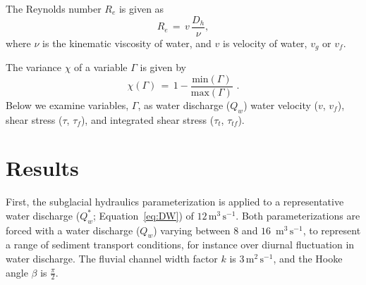 \documentclass[11pt]{article}
\newcommand{\unit}[1]{$\mathrm{#1}$}
\begin{document}
\begin{spacing}{1}
  The Reynolds number $R_e$ is given as 
  \begin{equation}
    \label{eq:re}
    R_e\,=\, v \,\frac{D_h}{\nu},
  \end{equation}
  \noindent where $\nu$ is the kinematic viscosity of water, and  $v$ is velocity of water, $v_g$ or $v_f$.
  
  The variance $ \chi$ of a variable $\Gamma$ is given by 
  \begin{equation}
    \label{eq:var}
    \chi(\Gamma) \,=\, 1 - \frac{\mathrm{min}(\Gamma)}{\mathrm{max}(\Gamma)}\,\,.
  \end{equation}
  \noindent Below we examine variables, $\Gamma$, as water discharge ($Q_w$) water velocity ($v$, $v_f$), shear stress ($\tau$, $\tau_f$), and integrated shear stress ($\tau_t$, $\tau_{tf}$).
  
  
  \section{Results}
  First, the subglacial hydraulics parameterization is applied to a representative water discharge ($Q_w^*$; Equation~\ref{eq:DW}) of $12$\,\unit{m}$^{3}$\,\unit{s}$^{-1}$.
  Both parameterizations are forced with a water discharge ($Q_w$) varying between $8$ and $16$ \,\unit{m}$^{3}$\,\unit{s}$^{-1}$, to represent a range of sediment transport conditions, for instance over diurnal fluctuation in water discharge. The fluvial channel width factor $k$ is $3$\,\unit{m}$^{2}$\,\unit{s}$^{-1}$, and the Hooke angle $\beta$ is $\frac{\pi}{2}$.
  

\end{spacing}
\end{document}
